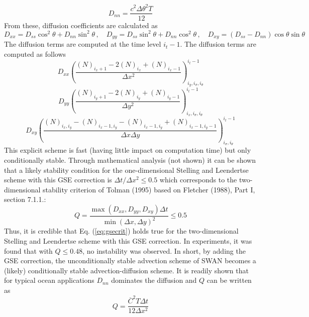 \documentclass[12pt]{book}
\begin{document}
\begin{equation}
  D_{nn} = \frac{c^2 \Delta \theta^2 T}{12}
\end{equation}
From these, diffusion coefficients are calculated as
\begin{equation}
  D_{xx} = D_{ss} \cos^2\theta + D_{nn} \sin^2 \theta \,, \quad D_{yy} = D_{ss} \sin^2\theta + D_{nn} \cos^2 \theta \,, \quad
  D_{xy} = (D_{ss}-D_{nn}) \cos \theta \sin \theta
\end{equation}
The diffusion terms are computed at the time level $i_t-1$. The diffusion terms are computed as follows
\begin{equation}
  D_{xx} \left( \frac{(N)_{i_x+1} - 2(N)_{i_x} + (N)_{i_x-1}}{\Delta x^2} \right)^{i_t-1}_{i_y, i_{\sigma}, i_{\theta}}
\end{equation}
\begin{equation}
  D_{yy} \left( \frac{(N)_{i_y+1} - 2(N)_{i_y} + (N)_{i_y-1}}{\Delta y^2} \right)^{i_t-1}_{i_x, i_{\sigma}, i_{\theta}}
\end{equation}
\begin{equation}
  D_{xy} \left( \frac{(N)_{i_x,i_y} - (N)_{i_x-1,i_y} - (N)_{i_x-1,i_y} + (N)_{i_x-1,i_y-1}}{\Delta x \Delta y} \right)^{i_t-1}_{i_{\sigma}, i_{\theta}}
\end{equation}
This explicit scheme is fast (having little impact on computation time) but only conditionally stable. Through mathematical analysis (not shown) it can be
shown that a likely stability condition for the one-dimensional Stelling and Leendertse scheme with this GSE correction is $\Delta t/\Delta x^2 \leq 0.5$ which
corresponds to the two-dimensional stability criterion of Tolman (1995) based on Fletcher (1988), Part I, section 7.1.1.:
\begin{equation}
  Q = \frac{\max(D_{xx},D_{yy},D_{xy})\Delta t}{\min(\Delta x,\Delta y)^2} \leq 0.5
  \label{eq:gsecrit}
\end{equation}
Thus, it is credible that Eq. (\ref{eq:gsecrit}) holds true for the two-dimensional Stelling and Leendertse scheme with this GSE correction. In experiments,
it was found that with $Q \leq 0.48$, no instability was observed. In short, by adding the GSE correction, the unconditionally stable advection scheme of
SWAN becomes a (likely) conditionally stable advection-diffusion scheme. It is readily shown that for typical ocean applications $D_{nn}$ dominates the
diffusion and $Q$ can be written as
\begin{equation}
  Q = \frac{{{\overline C}}^2 T \Delta t}{12 \Delta x^2}
  \label{eq:gsecrit2}
\end{equation}
\end{document}
